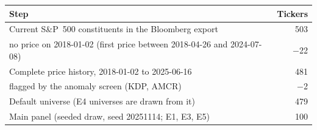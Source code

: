 \begin{tabular}{lr}
\toprule
Step & Tickers \\
\midrule
Current S\&P~500 constituents in the Bloomberg export & 503 \\
\quad no price on 2018-01-02 (first price between 2018-04-26 and 2024-07-08) & $-$22 \\
Complete price history, 2018-01-02 to 2025-06-16 & 481 \\
\quad flagged by the anomaly screen (KDP, AMCR) & $-$2 \\
Default universe (E4 universes are drawn from it) & 479 \\
Main panel (seeded draw, seed 20251114; E1, E3, E5) & 100 \\
\bottomrule
\end{tabular}
